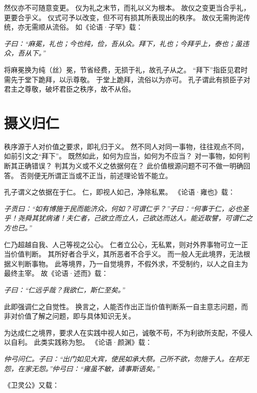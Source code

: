 \documentclass[11pt]{article}
\begin{document}
\newline

然仪亦不可随意变更。
仪为礼之末节，而礼以义为根本。
故仪之变更当合乎礼，更要合乎义。
仪式可予以改变，但不可有损其所表现出的秩序。
故仪无需拘泥传统，亦无需顺从流俗。
如《论语·子罕》载：

\textit{子曰：“麻冕，礼也；今也纯，俭，吾从众。拜下，礼也；今拜乎上，泰也；虽违众，吾从下。”}

将麻冕换为纯（丝）冕，节省经费，无损于礼，故孔子从之。
“拜下”指臣见君时需先于堂下跪拜，以示尊敬。
于堂上跪拜，流俗以为亦可。
孔子谓此有损臣子对君主之尊敬，破坏君臣之秩序，故不从俗。

\newline

\section{摄义归仁}
秩序源于人对价值之要求，即礼归于义。
然不同人对同一事物，往往观点不同，如前引文之“拜下”。
既然如此，如何为应当，如何为不应当？
对一事物，如何判断其正确错误？
判其为义或不义之依据何在？
此价值根源问题不可不做一明确回答。
否则便无所谓正当或不正当，前述理论皆不能立。

\newline

孔子谓义之依据在于仁。
仁，即视人如己，净除私累。
《论语·雍也》载：

\textit{子贡曰：“如有博施于民而能济众，何如？可谓仁乎？”子曰：“何事于仁，必也圣乎！尧舜其犹病诸！夫仁者，己欲立而立人，己欲达而达人。能近取譬，可谓仁之方也已。”}

仁乃超越自我、人己等视之公心。
仁者立公心，无私累，则对外界事物可立一正当价值判断。
其所好者合乎义，其所恶者不合乎义。
而一般人无此境界，无法根据义判断事物。
此等境界，乃一自觉境界，不假外求，不受制约，以人之自主为最终主宰。
故《论语·述而》载：

\textit{子曰：“仁远乎哉？我欲仁，斯仁至矣。”}

此即强调仁之自觉性。
换言之，人能否作出正当价值判断系一自主意志问题，而非对价值了解之问题，即与具体知识无关。

\newline

为达成仁之境界，要求人在实践中视人如己，诚敬不苟，不为利欲所支配，不侵人以自利。
此类实践称为恕。
《论语·颜渊》载：

\textit{仲弓问仁。子曰：“出门如见大宾，使民如承大祭。己所不欲，勿施于人。在邦无怨，在家无怨。”仲弓曰：“雍虽不敏，请事斯语矣。”}

《卫灵公》又载：
\end{document}
